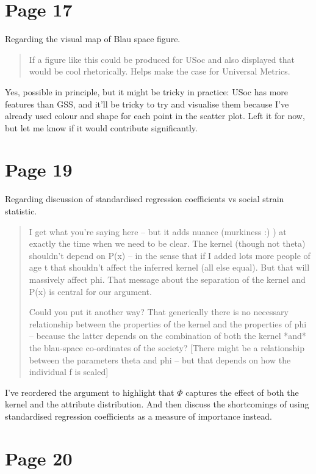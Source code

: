 \documentclass{scrartcl}
\begin{document}
\section*{Page 17}

Regarding the visual map of Blau space figure.

\begin{quote}
If a figure like this could be produced for USoc and also displayed that would be cool rhetorically. Helps make the case for Universal Metrics.
\end{quote}
Yes, possible in principle, but it might be tricky in practice: USoc has more features than GSS, and it'll be tricky to try and visualise them because I've already used colour and shape for each point in the scatter plot. Left it for now, but let me know if it would contribute significantly.

\section*{Page 19}

Regarding discussion of standardised regression coefficients vs social strain statistic.

\begin{quote}
I get what you're saying here -- but it adds nuance (murkiness :)  ) at exactly the time when we need to be clear. The kernel (though not theta) shouldn't depend on P(x) -- in the sense that if I added lots more people of age t that shouldn't affect the inferred kernel (all else equal). But that will massively affect phi. That message about the separation of the kernel and P(x) is central for our argument.

Could you put it another way? That generically there is no necessary relationship between the properties of the kernel and the properties of phi -- because the latter depends on the combination of both the kernel *and* the blau-space co-ordinates of the society? [There might be a relationship between the parameters theta and phi -- but that depends on how the individual f is scaled]
\end{quote}

I've reordered the argument to highlight that $\Phi$ captures the effect of both the kernel and the attribute distribution. And then discuss the shortcomings of using standardised regression coefficients as a measure of importance instead.

\section*{Page 20}
\end{document}
